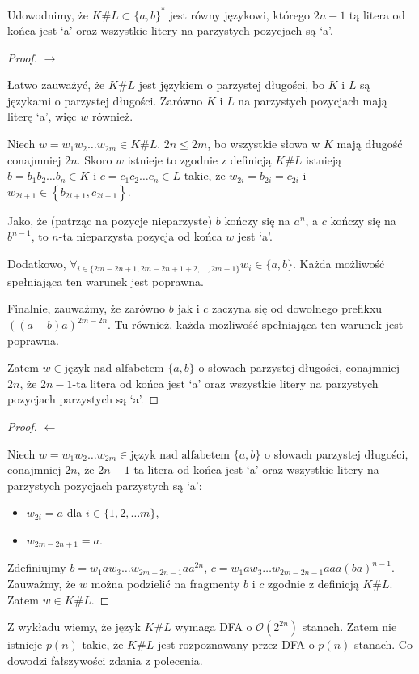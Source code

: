 \documentclass{article}
\theoremstyle{definition}
\theoremstyle{remark}
\begin{document}
Udowodnimy, że \(K \# L \subset \{ a, b \}^*\) jest równy językowi, którego
\(2n-1\) tą litera od końca jest `a' oraz wszystkie litery na parzystych
pozycjach są `a'.

\begin{proof}

    \(\rightarrow\)

    Łatwo zauważyć, że \(K \# L\) jest językiem o parzystej długości, bo \(K\) i \(L\) są językami o parzystej długości.
    Zarówno \(K\) i \(L\) na parzystych pozycjach mają literę `a', więc \(w\) również.

    Niech \(w = w_1 w_2 \ldots w_{2m} \in K \# L\). \(2n \leq 2m\), bo wszystkie
    słowa w \(K\) mają długość conajmniej \(2n\). Skoro \(w\) istnieje to zgodnie z
    definicją \(K \# L\) istnieją \(b=b_1 b_2 \ldots b_n \in K\) i \(c=c_1 c_2
    \ldots c_n \in L\) takie, że \(w_{2i} = b_{2i} = c_{2i}\) i \(w_{2i+1} \in
    \left\{ b_{2i+1}, c_{2i+1} \right\}\).

    Jako, że (patrząc na pozycje nieparzyste) \(b\) kończy się na \(a^n\), a \(c\)
    kończy się na \(b^{n-1}\), to \(n\)-ta nieparzysta pozycja od końca \(w\) jest
    `a'.

    Dodatkowo, \( \forall_{i \in \{2m - 2n + 1, 2m - 2n + 1 + 2, \ldots, 2m - 1 \}}
    w_i \in \{ a,b \}\). Każda możliwość spełniająca ten warunek jest poprawna.

    Finalnie, zauważmy, że zarówno \(b\) jak i \(c\) zaczyna się od dowolnego
    prefikxu \( ((a+b)a)^{2m-2n} \). Tu również, każda możliwość spełniająca ten
    warunek jest poprawna.

    Zatem \(w \in \text{język nad alfabetem } \{ a, b \}\) o słowach parzystej
    długości, conajmniej \(2n\), że \(2n-1\)-ta litera od końca jest `a' oraz
    wszystkie litery na parzystych pozycjach parzystych są `a'.

\end{proof}

\begin{proof}

    \(\leftarrow\)

    Niech \(w = w_1 w_2 \ldots w_{2m}\in \text{język nad alfabetem } \{ a, b \}\) o
    słowach parzystej długości, conajmniej \(2n\), że \(2n-1\)-ta litera od końca
    jest `a' oraz wszystkie litery na parzystych pozycjach parzystych są `a':

    \begin{itemize}
        \item \(w_{2i} = a\) dla \(i \in \{1, 2, \ldots m\}\),
        \item \(w_{2m-2n+1} = a\).
    \end{itemize}

    Zdefiniujmy \(b = w_1 a w_3 \ldots w_{2m-2n-1} a a^{2n}\), \(c = w_1 a w_3
    \ldots w_{2m-2n-1} a a a (ba)^{n-1}\). Zauważmy, że \(w\) można podzielić na
    fragmenty \(b\) i \(c\) zgodnie z definicją \(K \# L\). Zatem \(w \in K \# L\).

\end{proof}

Z wykładu wiemy, że język \(K \# L\) wymaga DFA o \( \mathcal{O}(2^{2n}) \) stanach.
Zatem nie istnieje \(p(n)\) takie, że \(K \# L\) jest rozpoznawany przez DFA o \(p(n)\) stanach.
Co dowodzi fałszywości zdania z polecenia.
\end{document}
